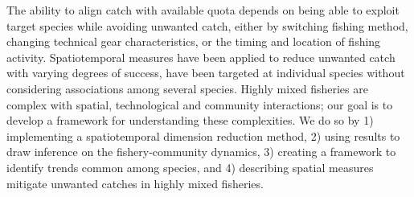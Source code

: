 \documentclass[12pt]{article}
\begin{document}
\begin{linenumbers}
The ability to align catch with available
quota depends on being able to exploit target species while avoiding unwanted
catch, either by switching fishing method, changing technical gear characteristics, or the timing and location of
fishing activity\cite{vanPutten2012a}. Spatiotemporal
measures have been applied to
reduce unwanted catch with varying degrees of success\cite{Needle2011,
	Dunn2014a}, 
 have been targeted at individual species
without considering associations among several
species. Highly mixed fisheries are complex with spatial, technological and
community interactions; our goal is to develop a framework for
understanding these complexities. We do so by 1) implementing a spatiotemporal
dimension reduction method, 2) using results to draw inference on
the fishery-community dynamics, 3) creating a framework to identify trends common
among species, and 4) describing  spatial measures
 mitigate unwanted
catches in highly mixed fisheries.


\end{linenumbers}
\end{document}
